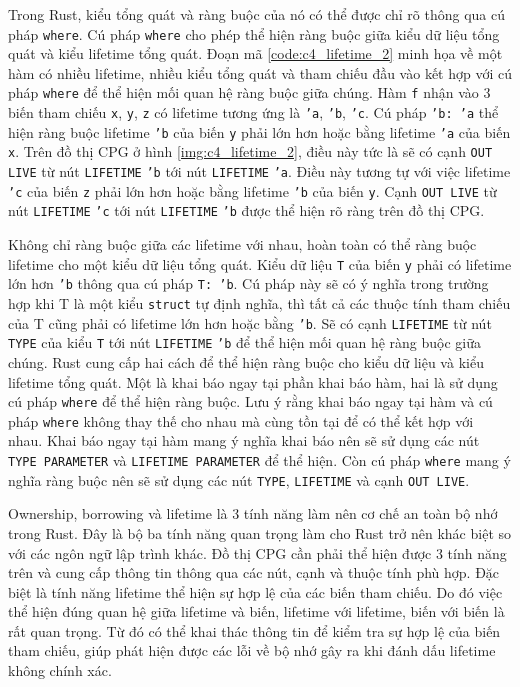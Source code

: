 Trong Rust, kiểu tổng quát và ràng buộc của nó có thể được chỉ rõ thông qua cú pháp \texttt{where}.
Cú pháp \texttt{where} cho phép thể hiện ràng buộc giữa kiểu dữ liệu tổng quát và kiểu lifetime tổng quát.
Đoạn mã \ref{code:c4_lifetime_2} minh họa về một hàm có nhiều lifetime, nhiều kiểu tổng quát và tham chiếu đầu vào kết hợp với cú pháp \texttt{where} để thể hiện mối quan hệ ràng buộc giữa chúng.
Hàm \texttt{f} nhận vào 3 biến tham chiếu \texttt{x}, \texttt{y}, \texttt{z} có lifetime tương ứng là \texttt{'a}, \texttt{'b}, \texttt{'c}.
Cú pháp \texttt{'b: 'a} thể hiện ràng buộc lifetime \texttt{'b} của biến \texttt{y} phải lớn hơn hoặc bằng lifetime \texttt{'a} của biến \texttt{x}.
Trên đồ thị CPG ở hình \ref{img:c4_lifetime_2}, điều này tức là sẽ có cạnh \texttt{OUT LIVE} từ nút \texttt{LIFETIME} \texttt{'b} tới nút \texttt{LIFETIME} \texttt{'a}.
Điều này tương tự với việc lifetime \texttt{'c} của biến \texttt{z} phải lớn hơn hoặc bằng lifetime \texttt{'b} của biến \texttt{y}.
Cạnh \texttt{OUT LIVE} từ nút \texttt{LIFETIME} \texttt{'c} tới nút \texttt{LIFETIME} \texttt{'b} được thể hiện rõ ràng trên đồ thị CPG.

Không chỉ ràng buộc giữa các lifetime với nhau, hoàn toàn có thể ràng buộc lifetime cho một kiểu dữ liệu tổng quát.
Kiểu dữ liệu \texttt{T} của biến \texttt{y} phải có lifetime lớn hơn \texttt{'b} thông qua cú pháp \texttt{T: 'b}.
Cú pháp này sẽ có ý nghĩa trong trường hợp khi T là một kiểu \texttt{struct} tự định nghĩa, thì tất cả các thuộc tính tham chiếu của T cũng phải có lifetime lớn hơn hoặc bằng \texttt{'b}.
Sẽ có cạnh \texttt{LIFETIME} từ nút \texttt{TYPE} của kiểu \texttt{T} tới nút \texttt{LIFETIME} \texttt{'b} để thể hiện mối quan hệ ràng buộc giữa chúng.
Rust cung cấp hai cách để thể hiện ràng buộc cho kiểu dữ liệu và kiểu lifetime tổng quát.
Một là khai báo ngay tại phần khai báo hàm, hai là sử dụng cú pháp \texttt{where} để thể hiện ràng buộc.
Lưu ý rằng khai báo ngay tại hàm và cú pháp \texttt{where} không thay thế cho nhau mà cùng tồn tại để có thể kết hợp với nhau.
Khai báo ngay tại hàm mang ý nghĩa khai báo nên sẽ sử dụng các nút \texttt{TYPE PARAMETER} và \texttt{LIFETIME PARAMETER} để thể hiện.
Còn cú pháp \texttt{where} mang ý nghĩa ràng buộc nên sẽ sử dụng các nút \texttt{TYPE}, \texttt{LIFETIME} và cạnh \texttt{OUT LIVE}.

Ownership, borrowing và lifetime là 3 tính năng làm nên cơ chế an toàn bộ nhớ trong Rust.
Đây là bộ ba tính năng quan trọng làm cho Rust trở nên khác biệt so với các ngôn ngữ lập trình khác.
Đồ thị CPG cần phải thể hiện được 3 tính năng trên và cung cấp thông tin thông qua các nút, cạnh và thuộc tính phù hợp.
Đặc biệt là tính năng lifetime thể hiện sự hợp lệ của các biến tham chiếu.
Do đó việc thể hiện đúng quan hệ giữa lifetime và biến, lifetime với lifetime, biến với biến là rất quan trọng.
Từ đó có thể khai thác thông tin để kiểm tra sự hợp lệ của biến tham chiếu, giúp phát hiện được các lỗi về bộ nhớ gây ra khi đánh dấu lifetime không chính xác.
